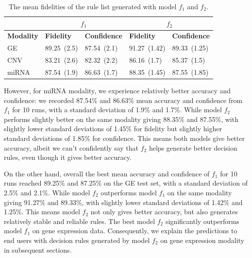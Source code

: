 \begin{table}[h!]
    \centering
    \caption{The mean fidelities of the rule list generated with model $f_1$ and $f_2$.}
    \label{table:rules_overall_result}
    \vspace{-2mm}
    \scriptsize{
    \begin{tabular}{l|l|l|l|l} 
        \hline
         & \multicolumn{2}{c|}{$f_1$} & \multicolumn{2}{c}{$f_2$} \\ 
        \hline
        \textbf{Modality} & \textbf{Fidelity} & \textbf{Confidence} & \textbf{Fidelity} & \textbf{Confidence} \\ 
        \hline
        GE  & 89.25~(2.5) & 87.54~(2.1) & 91.27~(1.42) & 89.33~(1.25) \\ 
        \cline{1-3}\cline{4-5}
        CNV & 83.21~(2.6) & 82.32~(2.2) & 86.16~(1.7) & 85.37~(1.5) \\ 
        \hline
        miRNA & 87.54~(1.9) & 86.63~(1.7) & 88.35~(1.45) & 87.55~(1.85) \\
        \hline
    \end{tabular}}
    \vspace{-4mm}
\end{table}

However, for miRNA modality, we experience relatively better accuracy and confidence: we recorded 87.54\% and 86.63\% mean accuracy and confidence from $f_1$ for 10 runs, with a standard deviation of 1.9\% and 1.7\%. While model $f_2$ performs slightly better on the same modality giving 88.35\% and 87.55\%, with slightly lower standard deviations of 1.45\% for fidelity but slightly higher standard deviations of 1.85\% for confidence. This means both models give better accuracy, albeit we can't confidently say that $f_2$ helps generate better decision rules, even though it gives better accuracy. 

\hspace*{3.5mm} On the other hand, overall the best mean accuracy and confidence of $f_1$ for 10 runs reached 89.25\% and 87.25\% on the GE test set, with a standard deviation of 2.5\% and 2.1\%. While model $f_2$ outperforms model $f_1$ on the same modality giving 91.27\% and 89.33\%, with slightly lower standard deviations of 1.42\% and 1.25\%. This means model $f_2$ not only gives better accuracy, but also generates relatively stable and reliable rules. The best model $f_2$ significantly outperforms model $f_1$ on gene expression data. Consequently, we explain the predictions to end users with decision rules generated by model $f_2$ on gene expression modality in subsequent sections. 

